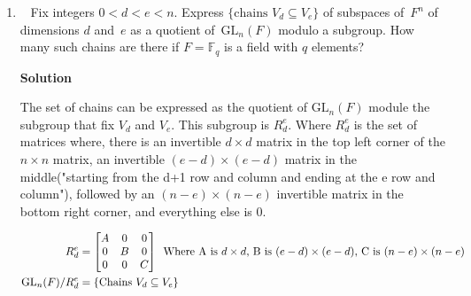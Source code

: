 \documentclass[11pt]{article}
\newcommand\score[1]{\marginpar{\vspace{-2ex}\color{blue}{#1/14}}\hspace{-1ex}}
\newcommand\0{\mathbf{0}}
\newcommand\FF{\mathbb{F}}
\newcommand\GL{\mathrm{GL}}
\newcommand\<{\langle}
\renewcommand\>{\rangle}
\begin{document}
\begin{enumerate}
If $T$ is an isomorphism, then $\overline T(v_1+W) = \overline T(v_2+W) \rightarrow $ 
$T(v_1) + W = T(v_2) + W\\ \rightarrow T(v_1) = T(v_2)$, the value of $w$ doesn't matter,
 therefore the two elements in the codimension($V/W$) are the same, therefore $\overline T$ is injective
 and since the dimension of both domain and output spaces are the same, it is also surjective, therefore it is an isomorphism.


This proof doesn't work for Infinite dimensional case, because you need not have $T(W)=W$(The assumption
that w doesn't matter isn't valid in the infinite case, because it is not guaranteed that the preimage of w
is in W). For example assume you have a the set of basis $e_i \; \vert i\geq 0, \;  i\in \mathbb{Z}$. 
Define $W$ as the subspace spanned by the basis vector $e_i, i \equiv 0 \; mod \; 2$. Then 
$V/W$ is spanned by the odd standard vectors.

Define $T(v)$ that maps $e_i$ to $e_{i+2}$ if \textit{i} is even; $e_1$ to $e_0$; and everything else 
to $e_{i-2}$. $T$ satifies all the properties($T(W) \subseteq W$) and is an isomorphism but $\overline T$ is not an isomorphism, because $e_1$ is mapped to 0, therefore 
$\overline T$ has a non-empty kernel, therefore the statement doesn't hold in an infinite dimensional case.
\pagebreak

\item\ \score{}%
Fix integers $0 < d < e < n$.  Express $\{\text{chains } V_d \subseteq
V_e\}$ of subspaces of~$F^n$ of dimensions $d$ and~$e$ as a quotient
of~$\GL_n(F)$ modulo a subgroup.  How many such chains are there if $F
= \FF_q$ is a field with $q$ elements?




\textbf{Solution}

The set of chains can be expressed as the quotient of $\GL_n(F)$ 
module the subgroup that fix $V_d$ and $V_e$. This subgroup is $R_d^e$. Where
$R_d^e$ is the set of matrices where, there is an invertible $d \times d$ matrix in the 
top left corner of the $n \times n$ matrix, an invertible $(e-d) \times (e-d)$ matrix in the middle("starting from the d+1 row and column and ending at the e row and column"), followed by an $ (n-e) \times (n-e)$
invertible matrix in the bottom right corner, and everything else is 0. 

\begin{align*}
    R_d^e &= \begin{bmatrix} A & 0 & 0 \\ 0 & B & 0 \\ 0 & 0 & C \end{bmatrix} \; \: \text{Where A is $d \times d$, B is $(e-d)\times (e-d)$, C is $ (n-e)\times (n-e)$}\\
    \GL_n(F)/R_d^e &= \{\text{Chains } V_d \subseteq V_e\}
\end{align*}


\end{enumerate}
\end{document}
